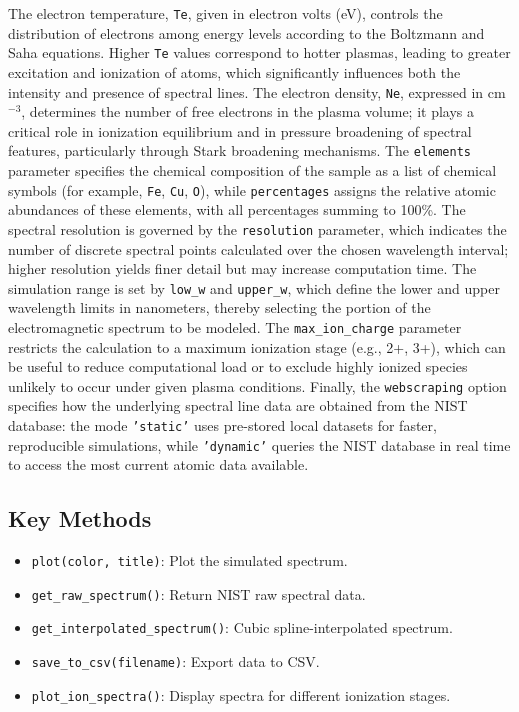 \documentclass[12pt,a4paper]{article}
\begin{document}
	 The electron temperature, \texttt{Te}, given in electron volts (eV), controls the distribution of electrons among energy levels according to the Boltzmann and Saha equations. Higher \texttt{Te} values correspond to hotter plasmas, leading to greater excitation and ionization of atoms, which significantly influences both the intensity and presence of spectral lines. The electron density, \texttt{Ne}, expressed in cm$^{-3}$, determines the number of free electrons in the plasma volume; it plays a critical role in ionization equilibrium and in pressure broadening of spectral features, particularly through Stark broadening mechanisms. The \texttt{elements} parameter specifies the chemical composition of the sample as a list of chemical symbols (for example, \texttt{Fe}, \texttt{Cu}, \texttt{O}), while \texttt{percentages} assigns the relative atomic abundances of these elements, with all percentages summing to 100\%. The spectral resolution is governed by the \texttt{resolution} parameter, which indicates the number of discrete spectral points calculated over the chosen wavelength interval; higher resolution yields finer detail but may increase computation time. The simulation range is set by \texttt{low\_w} and \texttt{upper\_w}, which define the lower and upper wavelength limits in nanometers, thereby selecting the portion of the electromagnetic spectrum to be modeled. The \texttt{max\_ion\_charge} parameter restricts the calculation to a maximum ionization stage (e.g., 2+, 3+), which can be useful to reduce computational load or to exclude highly ionized species unlikely to occur under given plasma conditions. Finally, the \texttt{webscraping} option specifies how the underlying spectral line data are obtained from the NIST database: the mode \texttt{'static'} uses pre-stored local datasets for faster, reproducible simulations, while \texttt{'dynamic'} queries the NIST database in real time to access the most current atomic data available.
	
	
	
	
	\subsection{Key Methods}
	\begin{itemize}
		\item \verb|plot(color, title)|: Plot the simulated spectrum.
		\item \verb|get_raw_spectrum()|: Return NIST raw spectral data.
		\item \verb|get_interpolated_spectrum()|: Cubic spline-interpolated spectrum.
		\item \verb|save_to_csv(filename)|: Export data to CSV.
		\item \verb|plot_ion_spectra()|: Display spectra for different ionization stages.
	\end{itemize}
	
\end{document}
